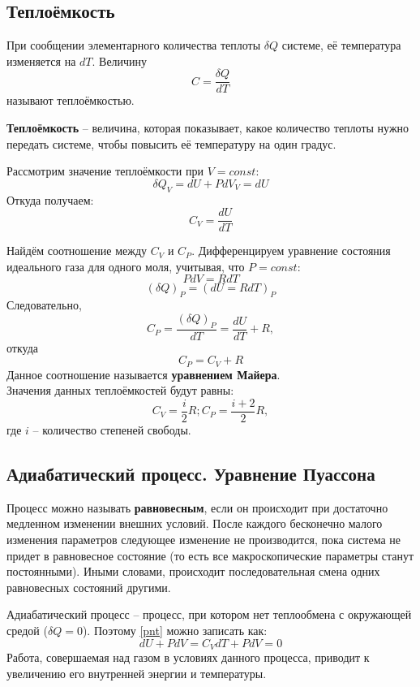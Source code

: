 \documentclass[a4paper,12pt]{article}
\begin{document}
\subsection{Теплоёмкость}
При сообщении элементарного количества теплоты $\delta Q$ системе, её температура изменяется на $dT$. Величину\\
$$C = \frac{\delta Q}{dT}$$
называют теплоёмкостью.

\textbf{Теплоёмкость} -- величина, которая показывает, какое количество теплоты нужно передать системе, чтобы повысить её температуру на один градус.

Рассмотрим значение теплоёмкости при $V = const$:
$$\delta Q_V = dU + PdV_V = dU$$
Откуда получаем:
\begin{equation}
C_V = \frac{dU}{dT}
\end{equation}

Найдём соотношение между $C_V$ и $C_P$.
Дифференцируем уравнение состояния идеального газа для одного моля, учитывая, что $P = const$:
$$PdV = RdT$$
$$(\delta Q)_P = (dU = RdT)_P$$
Следовательно,
$$C_P = \frac{(\delta Q)_P}{dT} = \frac{dU}{dT} + R,$$
откуда
\begin{equation}\label{mayer}
C_P = C_V + R
\end{equation}
Данное соотношение называется \textbf{уравнением Майера}.\\

Значения данных теплоёмкостей будут равны:
\begin{equation}
C_V = \frac{i}{2}R; C_P = \frac{i+2}{2}R,
\end{equation}
где $i$ -- количество степеней свободы.

\subsection{Адиабатический процесс. Уравнение Пуассона}
Процесс можно называть \textbf{равновесным}, если он происходит при достаточно медленном изменении внешних условий. После каждого бесконечно малого изменения параметров следующее изменение не производится, пока система не придет в равновесное состояние (то есть все макроскопические параметры станут постоянными). Иными словами, происходит последовательная смена одних равновесных состояний другими.

Адиабатический процесс -- процесс, при котором нет теплообмена с окружающей средой ($\delta Q = 0$). Поэтому \eqref{pnt} можно записать как:
\begin{equation}\label{adiabata}
dU + PdV = C_VdT + PdV = 0
\end{equation}
Работа, совершаемая над газом в условиях данного процесса, приводит к увеличению его внутренней энергии и температуры.
\end{document}

